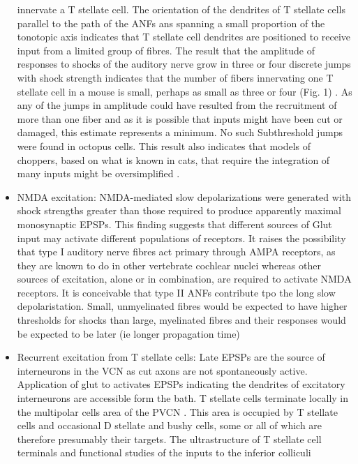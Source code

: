 \documentclass[10pt,a4paper]{article}
\begin{document}
\begin{itemize}
  innervate a T stellate cell.  The orientation of the dendrites of T stellate
  cells parallel to the path of the ANFs ans spanning a small proportion of the
  tonotopic axis indicates that T stellate cell dendrites are positioned to
  receive input from a limited group of fibres. The result that the amplitude of
  responses to shocks of the auditory nerve grow in three or four discrete jumps
  with shock strength indicates that the number of fibers innervating one T
  stellate cell in a mouse is small, perhaps as small as three or four (Fig. 1)
  . As any of the jumps in amplitude could have resulted from the recruitment of
  more than one fiber and as it is possible that inputs might have been cut or
  damaged, this estimate represents a minimum. No such Subthreshold jumps were
  found in octopus cells. This result also indicates that models of choppers,
  based on what is known in cats, that require the integration of many inputs
  might be oversimplified
  \citep{BanksSachs:1991,MolnarPfeiffer:1968,WangSachs:1995}.
\item NMDA excitation: NMDA-mediated slow depolarizations were generated with
  shock strengths greater than those required to produce apparently maximal
  monosynaptic EPSPs.  This finding suggests that different sources of Glut
  input may activate different populations of receptors.  It raises the
  possibility that type I auditory nerve fibres act primary through AMPA
  receptors, as they are known to do in other vertebrate cochlear nuclei
  \citep{RamanZhangEtAl:1994,ZhangTrussell:1994} whereas other sources of
  excitation, alone or in combination, are required to activate NMDA receptors.
  It is conceivable that type II ANFs contribute tpo the long slow
  depolaristation.  Small, unmyelinated fibres would be expected to have higher
  thresholds for shocks than large, myelinated fibres and their responses would
  be expected to be later (ie longer propagation time)
\item Recurrent excitation from T stellate cells: Late EPSPs are the source of
  interneurons in the VCN as cut axons are not spontaneously active.
  Application of glut to activates EPSPs indicating the dendrites of excitatory
  interneurons are accessible form the bath. T stellate cells terminate locally
  in the multipolar cells area of the PVCN
  \citep{FerragamoGoldingEtAl:1998a,OertelWuEtAl:1990}. This area is occupied by
  T stellate cells and occasional D stellate and bushy cells, some or all of
  which are therefore presumably their targets. The ultrastructure of T stellate
  cell terminals and functional studies of the inputs to the inferior colliculi

\end{itemize}
\end{document}
